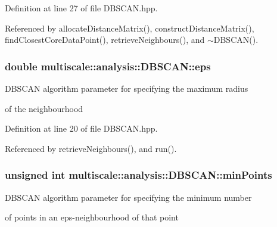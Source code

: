 Definition at line 27 of file D\-B\-S\-C\-A\-N.\-hpp.



Referenced by allocate\-Distance\-Matrix(), construct\-Distance\-Matrix(), find\-Closest\-Core\-Data\-Point(), retrieve\-Neighbours(), and $\sim$\-D\-B\-S\-C\-A\-N().

\hypertarget{classmultiscale_1_1analysis_1_1DBSCAN_a8d68cd84561cbb06bd138f8edf340b9f}{
\subsubsection[{eps}]{\setlength{\rightskip}{0pt plus 5cm}double multiscale\-::analysis\-::\-D\-B\-S\-C\-A\-N\-::eps\hspace{0.3cm}{\ttfamily [private]}}}\label{classmultiscale_1_1analysis_1_1DBSCAN_a8d68cd84561cbb06bd138f8edf340b9f}
\begin{DoxyVerb}                              DBSCAN algorithm parameter for specifying the maximum radius
\end{DoxyVerb}
 of the neighbourhood 

Definition at line 20 of file D\-B\-S\-C\-A\-N.\-hpp.



Referenced by retrieve\-Neighbours(), and run().

\hypertarget{classmultiscale_1_1analysis_1_1DBSCAN_a7bafd4070ac44e236fcc7f06d92b6572}{
\subsubsection[{min\-Points}]{\setlength{\rightskip}{0pt plus 5cm}unsigned int multiscale\-::analysis\-::\-D\-B\-S\-C\-A\-N\-::min\-Points\hspace{0.3cm}{\ttfamily [private]}}}\label{classmultiscale_1_1analysis_1_1DBSCAN_a7bafd4070ac44e236fcc7f06d92b6572}
\begin{DoxyVerb}                  DBSCAN algorithm parameter for specifying the minimum number
\end{DoxyVerb}
 of points in an eps-\/neighbourhood of that point 

